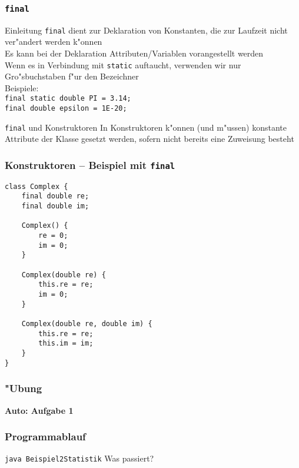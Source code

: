 \documentclass{beamer}
\begin{document}
\begin{frame}
\frametitle{\texttt{final}}
\begin{block}{Einleitung}
\texttt{final} dient zur Deklaration von Konstanten, die zur Laufzeit nicht ver"andert werden k"onnen\\
Es kann bei der Deklaration Attributen/Variablen vorangestellt werden\\
Wenn es in Verbindung mit \texttt{static} auftaucht, verwenden wir nur Gro"sbuchstaben f"ur den Bezeichner\\
Beispiele:\\
\lstinline|final static double PI = 3.14;|\\
\lstinline|final double epsilon = 1E-20;|
\end{block}

\pause

\begin{block}{\texttt{final} und Konstruktoren}
In Konstruktoren k"onnen (und m"ussen) konstante Attribute der Klasse gesetzt werden, sofern nicht bereits eine Zuweisung besteht
\end{block}
\end{frame}


\begin{frame}[containsverbatim]
\frametitle{Konstruktoren -- Beispiel mit \texttt{final}}
\begin{lstlisting}
class Complex {
	final double re;
	final double im;

	Complex() {
		re = 0;
		im = 0;
	}

	Complex(double re) {
		this.re = re;
		im = 0;
	}

	Complex(double re, double im) {
		this.re = re;
		this.im = im;
	}
}
\end{lstlisting}
\end{frame}


\begin{frame}
\frametitle{"Ubung}
\begin{center}
\textbf{\Huge Auto: Aufgabe 1}
\end{center}
\end{frame}


\begin{frame}
\frametitle{Programmablauf}


\pause

\begin{block}{\texttt{java Beispiel2Statistik}}
Was passiert?
\end{block}
\end{frame}
\end{document}
